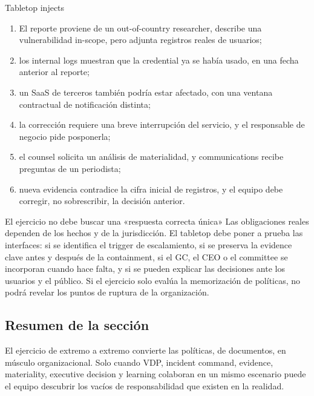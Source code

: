\begin{importantbox}{Tabletop injects}
\begin{enumerate}
  \item El reporte proviene de un out-of-country researcher, describe una vulnerabilidad in-scope, pero adjunta registros reales de usuarios;
  \item los internal logs muestran que la credential ya se había usado, en una fecha anterior al reporte;
  \item un SaaS de terceros también podría estar afectado, con una ventana contractual de notificación distinta;
  \item la corrección requiere una breve interrupción del servicio, y el responsable de negocio pide posponerla;
  \item el counsel solicita un análisis de materialidad, y communications recibe preguntas de un periodista;
  \item nueva evidencia contradice la cifra inicial de registros, y el equipo debe corregir, no sobrescribir, la decisión anterior.
\end{enumerate}
\end{importantbox}

\begin{warningbox}{El ejercicio no debe buscar una «respuesta correcta única»}
Las obligaciones reales dependen de los hechos y de la jurisdicción. El tabletop debe poner a prueba las interfaces: si se identifica el trigger de escalamiento, si se preserva la evidence clave antes y después de la containment, si el GC, el CEO o el committee se incorporan cuando hace falta, y si se pueden explicar las decisiones ante los usuarios y el público. Si el ejercicio solo evalúa la memorización de políticas, no podrá revelar los puntos de ruptura de la organización.
\end{warningbox}

\subsection{Resumen de la sección}

El ejercicio de extremo a extremo convierte las políticas, de documentos, en músculo organizacional. Solo cuando VDP, incident command, evidence, materiality, executive decision y learning colaboran en un mismo escenario puede el equipo descubrir los vacíos de responsabilidad que existen en la realidad.
